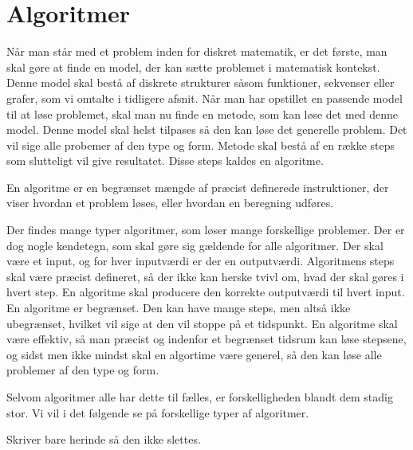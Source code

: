 \chapter{Algoritmer} \label{kap.algo}
Når man står med et problem inden for diskret matematik, er det første, man skal gøre at finde en model, der kan sætte problemet i matematisk kontekst. Denne model skal bestå af diskrete strukturer såsom funktioner, sekvenser eller grafer, som vi omtalte i tidligere afsnit. Når man har opstillet en passende model til at løse problemet, skal man nu finde en metode, som kan løse det med denne model. Denne model skal helst tilpases så den kan løse det generelle problem. Det vil sige alle probemer af den type og form. Metode skal bestå af en række steps som slutteligt vil give resultatet. Disse steps kaldes en algoritme. 
\begin{defn}
[Algoritmer] En algoritme er en begrænset mængde af præcist definerede instruktioner, der viser hvordan et problem løses, eller hvordan en beregning udføres. 

\end{defn}
Der findes mange typer algoritmer, som løser mange forskellige problemer. Der er dog nogle kendetegn, som skal gøre sig gældende for alle algoritmer. Der skal være et input, og for hver inputværdi er der en outputværdi. Algoritmens steps skal være præcist defineret, så der ikke kan herske tvivl om, hvad der skal gøres i hvert step. En algoritme skal producere den korrekte outputværdi til hvert input. En algoritme er begrænset. Den kan have mange steps, men altså ikke ubegrænset, hvilket vil sige at den vil stoppe på et tidspunkt. En algoritme skal være effektiv, så man præcist og indenfor et begrænset tidsrum kan løse stepsene, og sidst men ikke mindst skal en algortime være generel, så den kan løse alle problemer af den type og form.

Selvom algoritmer alle har dette til fælles, er forskelligheden blandt dem stadig stor. Vi vil i det følgende se på forskellige typer af algoritmer.






Skriver bare herinde så den ikke slettes.